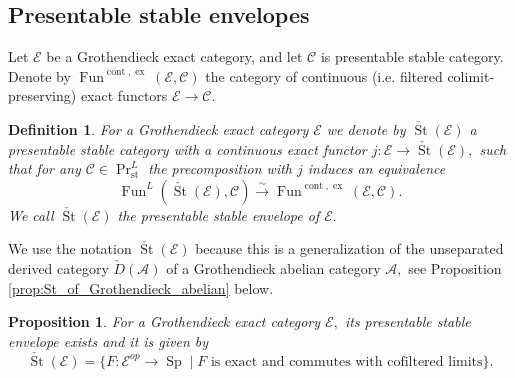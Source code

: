 \documentclass[11pt,leqno]{amsart}
\newtheorem{defi}[theo]{Definition}
\newtheorem{prop}[theo]{Proposition}
\numberwithin{equation}{section}
\newcommand{\xto}{\xrightarrow}
\newcommand{\cont}{\operatorname{cont}}
\newcommand{\ex}{\operatorname{ex}}
\newcommand{\St}{\operatorname{St}}
\newcommand{\st}{\operatorname{st}}
\newcommand{\cA}{{\mathcal A}}
\newcommand{\cC}{{\mathcal C}}
\newcommand{\cE}{{\mathcal E}}
\newcommand{\Fun}{\operatorname{Fun}}
\newcommand{\Sp}{\operatorname{Sp}}
\begin{document}
\subsection{Presentable stable envelopes}

Let $\cE$ be a Grothendieck exact category, and let $\cC$ is presentable stable category. Denote by $\Fun^{\cont,\ex}(\cE,\cC)$ the category of continuous (i.e. filtered colimit-preserving) exact functors $\cE\to\cC.$  

\begin{defi}
For a Grothendieck exact category $\cE$ we denote by $\check{\St}(\cE)$ a presentable stable category with a continuous exact functor $j:\cE\to\check{\St}(\cE),$ such that for any $\cC\in\Pr^L_{\st}$ the precomposition with $j$ induces an equivalence
\begin{equation*}
\Fun^L(\check{\St}(\cE),\cC)\xto{\sim}\Fun^{\cont,\ex}(\cE,\cC).
\end{equation*}
We call $\check{\St}(\cE)$ the presentable stable envelope of $\cE.$
\end{defi}

We use the notation $\check{\St}(\cE)$ because this is a generalization of the unseparated derived category $\check{D}(\cA)$ of a Grothendieck abelian category $\cA,$ see Proposition \ref{prop:St_of_Grothendieck_abelian} below.

\begin{prop}\label{prop:check_St_of_Grothendieck_exact_category}
For a Grothendieck exact category $\cE,$ its presentable stable envelope exists and it is given by 
\begin{equation}\label{eq:presentable_stable_envelope}
\check{\St}(\cE)=\{F:\cE^{op}\to \Sp\mid F\text{ is exact and commutes with cofiltered limits}\}.
\end{equation}
\end{prop}
\end{document}
